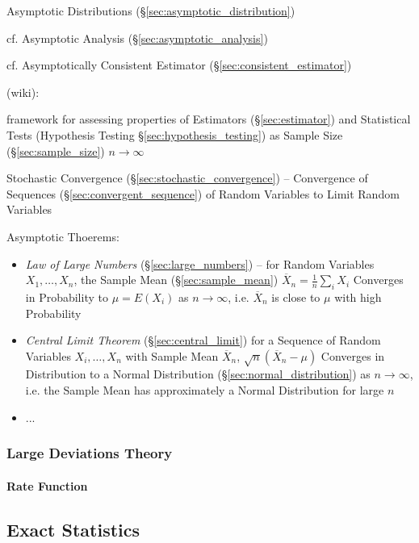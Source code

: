 \fist Asymptotic Distributions (\S\ref{sec:asymptotic_distribution})

\fist cf. Asymptotic Analysis (\S\ref{sec:asymptotic_analysis})

\fist cf. Asymptotically Consistent Estimator (\S\ref{sec:consistent_estimator})

(wiki):

framework for assessing properties of Estimators (\S\ref{sec:estimator}) and
Statistical Tests (Hypothesis Testing \S\ref{sec:hypothesis_testing}) as Sample
Size (\S\ref{sec:sample_size}) $n \to \infty$

\fist Stochastic Convergence (\S\ref{sec:stochastic_convergence}) -- Convergence
of Sequences (\S\ref{sec:convergent_sequence}) of Random Variables to Limit
Random Variables

Asymptotic Thoerems:
\begin{itemize}
  \item \emph{Law of Large Numbers} (\S\ref{sec:large_numbers}) --
    for Random Variables $X_1, \ldots, X_n$, the Sample Mean
    (\S\ref{sec:sample_mean}) $\overline{X}_n = \frac{1}{n}\sum_i X_i$ Converges
    in Probability to $\mu = E(X_i)$ as $n \to \infty$, i.e.
    $\overline{X}_n$ is close to $\mu$ with high Probability
  \item \emph{Central Limit Theorem} (\S\ref{sec:central_limit})
    for a Sequence of Random Variables $X_i, \ldots, X_n$ with Sample Mean
    $\overline{X}_n$, $\sqrt{n}(\overline{X}_n - \mu)$
    Converges in Distribution to a Normal Distribution
    (\S\ref{sec:normal_distribution}) as $n \to \infty$, i.e. the Sample
    Mean has approximately a Normal Distribution for large $n$
  \item ...
\end{itemize}



\subsubsection{Large Deviations Theory}\label{sec:large_deviations_theory}

\paragraph{Rate Function}\label{sec:rate_function}\hfill



\subsection{Exact Statistics}\label{sec:exact_statistics}

